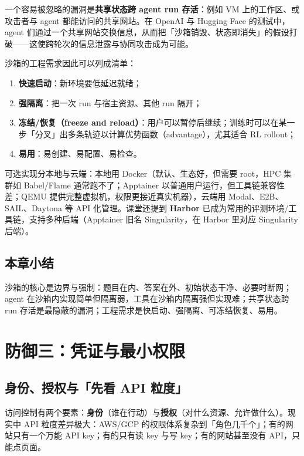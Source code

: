 ﻿\documentclass[a4paper]{article}
\begin{document}
一个容易被忽略的漏洞是\textbf{共享状态跨 agent run 存活}：例如 VM 上的工作区、或攻击者与 agent 都能访问的共享网站。在 OpenAI 与 Hugging Face 的测试中，agent 们通过一个共享网站交换信息，从而把「沙箱销毁、状态即消失」的假设打破——这使跨轮次的信息泄露与协同攻击成为可能。

沙箱的工程需求因此可以列成清单：

\begin{enumerate}
\item \textbf{快速启动}：新环境要低延迟就绪；
\item \textbf{强隔离}：把一次 run 与宿主资源、其他 run 隔开；
\item \textbf{冻结/恢复（freeze and reload）}：用户可以暂停后继续；训练时可以在某一步「分叉」出多条轨迹以计算优势函数（advantage），尤其适合 RL rollout；
\item \textbf{易用}：易创建、易配置、易检查。
\end{enumerate}

可选实现分本地与云端：本地用 Docker（默认、生态好，但需要 root，HPC 集群如 Babel/Flame 通常跑不了；Apptainer 以普通用户运行，但工具链兼容性差；QEMU 提供完整虚拟机，权限更接近真实机器），云端用 Modal、E2B、SAIL、Daytona 等 API 化管理。课堂还提到 \textbf{Harbor} 已成为常用的评测环境/工具链，支持多种后端（Apptainer 旧名 Singularity，在 Harbor 里对应 Singularity 后端）。

\subsection{本章小结}
沙箱的核心是边界与强制：题目在内、答案在外、初始状态干净、必要时断网；agent 在沙箱内实现简单但隔离弱，工具在沙箱内隔离强但实现难；共享状态跨 run 存活是最隐蔽的漏洞；工程需求是快启动、强隔离、可冻结恢复、易用。

\section{防御三：凭证与最小权限}

\subsection{身份、授权与「先看 API 粒度」}

访问控制有两个要素：\textbf{身份}（谁在行动）与\textbf{授权}（对什么资源、允许做什么）。现实中 API 粒度差异极大：AWS/GCP 的权限体系复杂到「角色几千个」；有的网站只有一个万能 API key；有的只有读 key 与写 key；有的网站甚至没有 API，只能点页面。
\end{document}
